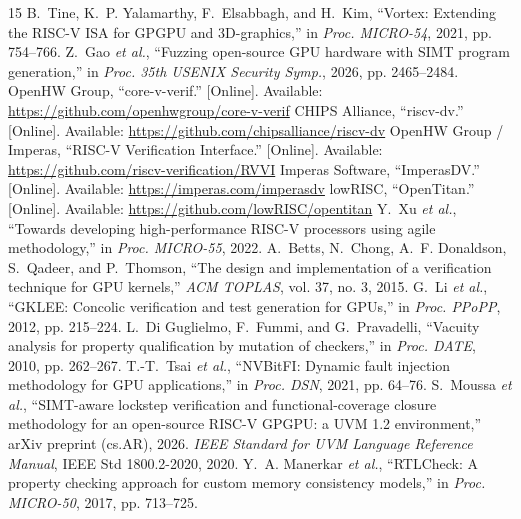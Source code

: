 \documentclass[conference]{IEEEtran}
\begin{document}
\begin{thebibliography}{15}
	B.~Tine, K.~P. Yalamarthy, F.~Elsabbagh, and H.~Kim, ``Vortex:
	Extending the RISC-V ISA for GPGPU and 3D-graphics,'' in \emph{Proc.
		MICRO-54}, 2021, pp. 754--766.
	Z.~Gao \emph{et al.}, ``Fuzzing open-source GPU hardware with SIMT
	program generation,'' in \emph{Proc. 35th USENIX Security Symp.},
	2026, pp. 2465--2484.
	OpenHW Group, ``core-v-verif.'' [Online]. Available:
	\url{https://github.com/openhwgroup/core-v-verif}
	CHIPS Alliance, ``riscv-dv.'' [Online]. Available:
	\url{https://github.com/chipsalliance/riscv-dv}
	OpenHW Group / Imperas, ``RISC-V Verification Interface.'' [Online].
	Available: \url{https://github.com/riscv-verification/RVVI}
	Imperas Software, ``ImperasDV.'' [Online]. Available:
	\url{https://imperas.com/imperasdv}
	lowRISC, ``OpenTitan.'' [Online]. Available:
	\url{https://github.com/lowRISC/opentitan}
	Y.~Xu \emph{et al.}, ``Towards developing high-performance RISC-V
	processors using agile methodology,'' in \emph{Proc. MICRO-55}, 2022.
	A.~Betts, N.~Chong, A.~F. Donaldson, S.~Qadeer, and P.~Thomson,
	``The design and implementation of a verification technique for GPU
	kernels,'' \emph{ACM TOPLAS}, vol. 37, no. 3, 2015.
	G.~Li \emph{et al.}, ``GKLEE: Concolic verification and test
	generation for GPUs,'' in \emph{Proc. PPoPP}, 2012, pp. 215--224.
	L.~Di Guglielmo, F.~Fummi, and G.~Pravadelli, ``Vacuity analysis for
	property qualification by mutation of checkers,'' in \emph{Proc.
		DATE}, 2010, pp. 262--267.
	T.-T.~Tsai \emph{et al.}, ``NVBitFI: Dynamic fault injection
	methodology for GPU applications,'' in \emph{Proc. DSN}, 2021,
	pp. 64--76.
	S.~Moussa \emph{et al.}, ``SIMT-aware lockstep verification and
	functional-coverage closure methodology for an open-source RISC-V
	GPGPU: a UVM 1.2 environment,'' arXiv preprint (cs.AR), 2026.
	\emph{IEEE Standard for UVM Language Reference Manual}, IEEE Std
	1800.2-2020, 2020.
	Y.~A. Manerkar \emph{et al.}, ``RTLCheck: A property checking
	approach for custom memory consistency models,'' in \emph{Proc.
		MICRO-50}, 2017, pp. 713--725.
\end{thebibliography}
\end{document}

